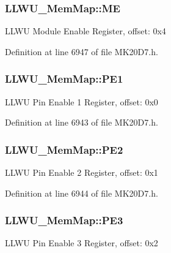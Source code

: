 \subsubsection[{\texorpdfstring{ME}{ME}}]{ L\+L\+W\+U\+\_\+\+Mem\+Map\+::\+ME}\hypertarget{struct_l_l_w_u___mem_map_ae8dea688fae93c1a5f9dd22b70cdc5cf}{}\label{struct_l_l_w_u___mem_map_ae8dea688fae93c1a5f9dd22b70cdc5cf}
L\+L\+WU Module Enable Register, offset\+: 0x4 

Definition at line 6947 of file M\+K20\+D7.\+h.

\subsubsection[{\texorpdfstring{P\+E1}{PE1}}]{ L\+L\+W\+U\+\_\+\+Mem\+Map\+::\+P\+E1}\hypertarget{struct_l_l_w_u___mem_map_abb0c4dd1142a84dc991e6dda4a8381d6}{}\label{struct_l_l_w_u___mem_map_abb0c4dd1142a84dc991e6dda4a8381d6}
L\+L\+WU Pin Enable 1 Register, offset\+: 0x0 

Definition at line 6943 of file M\+K20\+D7.\+h.

\subsubsection[{\texorpdfstring{P\+E2}{PE2}}]{ L\+L\+W\+U\+\_\+\+Mem\+Map\+::\+P\+E2}\hypertarget{struct_l_l_w_u___mem_map_a53d86f5153bce17f9927472da4fade5a}{}\label{struct_l_l_w_u___mem_map_a53d86f5153bce17f9927472da4fade5a}
L\+L\+WU Pin Enable 2 Register, offset\+: 0x1 

Definition at line 6944 of file M\+K20\+D7.\+h.

\subsubsection[{\texorpdfstring{P\+E3}{PE3}}]{ L\+L\+W\+U\+\_\+\+Mem\+Map\+::\+P\+E3}\hypertarget{struct_l_l_w_u___mem_map_a96a722e1ae66ee87b88407ef622cf243}{}\label{struct_l_l_w_u___mem_map_a96a722e1ae66ee87b88407ef622cf243}
L\+L\+WU Pin Enable 3 Register, offset\+: 0x2 

